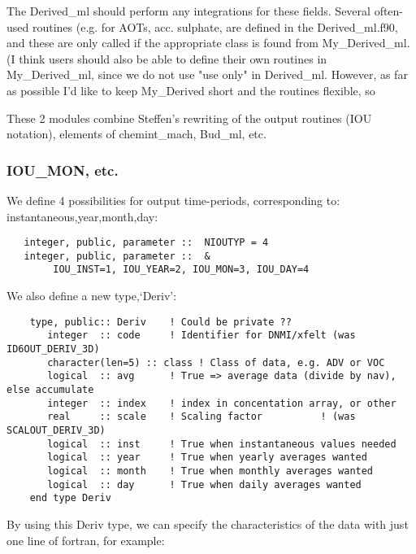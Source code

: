  The Derived\_ml should perform any integrations for these fields.
 Several often-used routines (e.g. for AOTs, acc. sulphate, are defined 
 in the Derived\_ml.f90, and these are only called if the appropriate
 class is found from My\_Derived\_ml. (I think users should also be
 able to define their own routines in My\_Derived\_ml, since
 we do not use "use only" in Derived\_ml. However, as far as possible
 I'd like to keep My\_Derived short and the routines flexible, so 
  
  
 These 2 modules combine Steffen's rewriting of the output routines
 (IOU notation), elements of chemint\_mach, Bud\_ml, etc.

  \subsubsection*{IOU\_MON, etc.}

  We define 4 possibilities
  for output time-periods, corresponding to: instantaneous,year,month,day:

  \begin{small}\begin{verbatim}
   integer, public, parameter ::  NIOUTYP = 4
   integer, public, parameter ::  & 
        IOU_INST=1, IOU_YEAR=2, IOU_MON=3, IOU_DAY=4
  \end{verbatim}
  \end{small}


   We also define a new type,`Deriv':

  \begin{small}\begin{verbatim}
    type, public:: Deriv    ! Could be private ??
       integer  :: code     ! Identifier for DNMI/xfelt (was ID6OUT_DERIV_3D)
       character(len=5) :: class ! Class of data, e.g. ADV or VOC
       logical  :: avg      ! True => average data (divide by nav), else accumulate
       integer  :: index    ! index in concentation array, or other
       real     :: scale    ! Scaling factor          ! (was SCALOUT_DERIV_3D)
       logical  :: inst     ! True when instantaneous values needed
       logical  :: year     ! True when yearly averages wanted
       logical  :: month    ! True when monthly averages wanted
       logical  :: day      ! True when daily averages wanted
    end type Deriv
  \end{verbatim}
  \end{small}


  By using this Deriv type, we can specify the characteristics of the data
  with just one line of fortran, for example:


